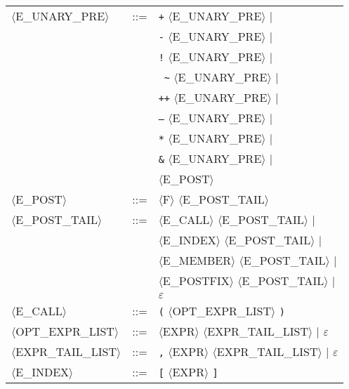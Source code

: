 \begin{footnotesize}
\begin{longtable}{>{\raggedright\arraybackslash}p{4cm}@{\ }>{\raggedright\arraybackslash}p{1.5cm}@{\ }>{\raggedright\arraybackslash}p{8.5cm}}
      $\langle$E\_UNARY\_PRE$\rangle$ & ::= & \texttt{+} $\langle$E\_UNARY\_PRE$\rangle$ $\mid$ \\
      & & \texttt{-} $\langle$E\_UNARY\_PRE$\rangle$ $\mid$ \\
      & & \texttt{!} $\langle$E\_UNARY\_PRE$\rangle$ $\mid$ \\
      & & \texttt{ \~} $\langle$E\_UNARY\_PRE$\rangle$ $\mid$ \\
      & & \texttt{++} $\langle$E\_UNARY\_PRE$\rangle$ $\mid$ \\
      & & \texttt{--} $\langle$E\_UNARY\_PRE$\rangle$ $\mid$ \\
      & & \texttt{*} $\langle$E\_UNARY\_PRE$\rangle$ $\mid$ \\
      & & \texttt{\&} $\langle$E\_UNARY\_PRE$\rangle$ $\mid$ \\
      & & $\langle$E\_POST$\rangle$ \\
      
      $\langle$E\_POST$\rangle$ & ::= & $\langle$F$\rangle$ $\langle$E\_POST\_TAIL$\rangle$ \\
      
      $\langle$E\_POST\_TAIL$\rangle$ & ::= & $\langle$E\_CALL$\rangle$ $\langle$E\_POST\_TAIL$\rangle$ $\mid$ \\
      & & $\langle$E\_INDEX$\rangle$ $\langle$E\_POST\_TAIL$\rangle$ $\mid$ \\
      & & $\langle$E\_MEMBER$\rangle$ $\langle$E\_POST\_TAIL$\rangle$ $\mid$ \\
      & & $\langle$E\_POSTFIX$\rangle$ $\langle$E\_POST\_TAIL$\rangle$ $\mid$ \\
      & & $\varepsilon$ \\
      
      $\langle$E\_CALL$\rangle$ & ::= & \texttt{(} $\langle$OPT\_EXPR\_LIST$\rangle$ \texttt{)} \\
      
      $\langle$OPT\_EXPR\_LIST$\rangle$ & ::= & $\langle$EXPR$\rangle$ $\langle$EXPR\_TAIL\_LIST$\rangle$ $\mid$ $\varepsilon$ \\
      
      $\langle$EXPR\_TAIL\_LIST$\rangle$ & ::= & \texttt{,} $\langle$EXPR$\rangle$ $\langle$EXPR\_TAIL\_LIST$\rangle$ $\mid$ $\varepsilon$ \\
      
      $\langle$E\_INDEX$\rangle$ & ::= & \texttt{[} $\langle$EXPR$\rangle$ \texttt{]} \\
      

\end{longtable}
\end{footnotesize}
